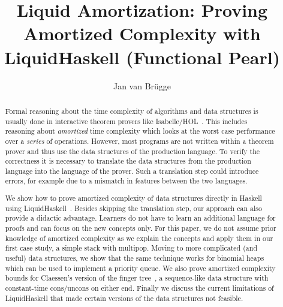 \documentclass[sigplan,screen]{acmart}
\begin{document}
\title{Liquid Amortization: Proving Amortized Complexity with LiquidHaskell (Functional Pearl)}

\author{Jan van Brügge}


\begin{abstract}
Formal reasoning about the time complexity of algorithms and data structures is usually done in interactive theorem provers like Isabelle/HOL~\cite{isabelle}. This includes reasoning about \textit{amortized} time complexity which looks at the worst case performance over a \textit{series} of operations. However, most programs are not written within a theorem prover and thus use the data structures of the production language. To verify the correctness it is necessary to translate the data structures from the production language into the language of the prover. Such a translation step could introduce errors, for example due to a mismatch in features between the two languages.

We show how to prove amortized complexity of data structures directly in Haskell using LiquidHaskell~\cite{liquidhaskell}. Besides skipping the translation step, our approach can also provide a didactic advantage. Learners do not have to learn an additional language for proofs and can focus on the new concepts only. For this paper, we do not assume prior knowledge of amortized complexity as we explain the concepts and apply them in our first case study, a simple stack with multipop. Moving to more complicated (and useful) data structures, we show that the same technique works for binomial heaps which can be used to implement a priority queue. We also prove amortized complexity bounds for Claessen's version of the finger tree~\cite{fingertrees_new}, a sequence-like data structure with constant-time cons/uncons on either end. Finally we discuss the current limitations of LiquidHaskell that made certain versions of the data structures not feasible.
\end{abstract}
\end{document}
